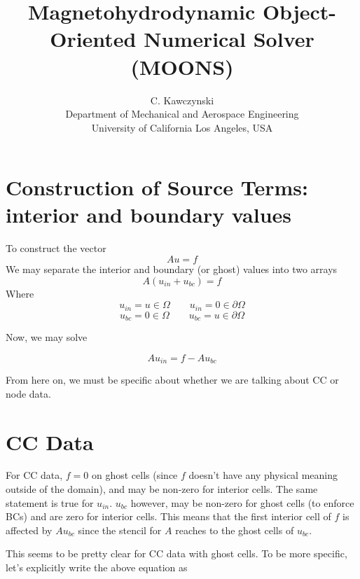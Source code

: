 \documentclass[11pt]{article}
\begin{document}
\doublespacing
\title{Magnetohydrodynamic Object-Oriented Numerical Solver (MOONS)}
\author{C. Kawczynski \\
Department of Mechanical and Aerospace Engineering \\
University of California Los Angeles, USA\\
}
\maketitle


\section{Construction of Source Terms: interior and boundary values}
To construct the vector
\begin{equation}
Au=f
\end{equation}
We may separate the interior and boundary (or ghost) values into two arrays
\begin{equation}
A(u_{in} + u_{bc}) = f
\end{equation}
Where
\begin{equation}
u_{in} = u \in \Omega \qquad u_{in} = 0 \in \partial \Omega
\end{equation}
\begin{equation}
u_{bc} = 0 \in \Omega \qquad u_{bc} = u \in \partial \Omega
\end{equation}

Now, we may solve

\begin{equation}
Au_{in} = f - Au_{bc}
\end{equation}

From here on, we must be specific about whether we are talking about CC or node data.

\section{CC Data}
For CC data, $f = 0$ on ghost cells (since $f$ doesn't have any physical meaning outside of the domain), and may be non-zero for interior cells. The same statement is true for $u_{in}$. $u_{bc}$ however, may be non-zero for ghost cells (to enforce BCs) and are zero for interior cells. This means that the first interior cell of $f$ is affected by $Au_{bc}$ since the stencil for $A$ reaches to the ghost cells of $u_{bc}$.

This seems to be pretty clear for CC data with ghost cells.
To be more specific, let's explicitly write the above equation as
\end{document}
